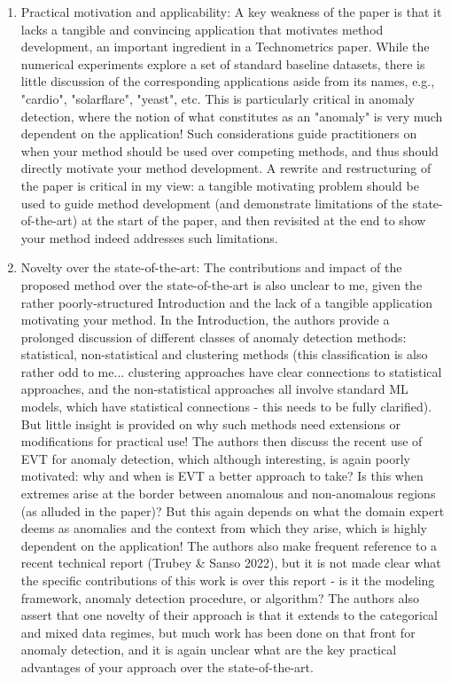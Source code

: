 \documentclass{article}
\begin{document}
\begin{enumerate}
\item Practical motivation and applicability: A key weakness of the paper is that it lacks a 
    tangible and convincing application that motivates method development, an important 
    ingredient in a Technometrics paper. While the numerical experiments explore a set of 
    standard baseline datasets, there is little discussion of the corresponding applications 
    aside from its names, e.g., "cardio", "solarflare", "yeast", etc. This is particularly 
    critical in anomaly detection, where the notion of what constitutes as an "anomaly" is 
    very much dependent on the application! Such considerations guide practitioners on when 
    your method should be used over competing methods, and thus should directly motivate your 
    method development. A rewrite and restructuring of the paper is critical in my view: a 
    tangible motivating problem should be used to guide method development (and demonstrate 
    limitations of the state-of-the-art) at the start of the paper, and then revisited at the 
    end to show your method indeed addresses such limitations. 

\item Novelty over the state-of-the-art: The contributions and impact of the proposed method 
    over the state-of-the-art is also unclear to me, given the rather poorly-structured 
    Introduction and the lack of a tangible application motivating your method. In the 
    Introduction, the authors provide a prolonged discussion of different classes of anomaly 
    detection methods: statistical, non-statistical and clustering methods (this classification 
    is also rather odd to me... clustering approaches have clear connections to statistical 
    approaches, and the non-statistical approaches all involve standard ML models, which have 
    statistical connections - this needs to be fully clarified). But little insight is provided 
    on why such methods need extensions or modifications for practical use! The authors then 
    discuss the recent use of EVT for anomaly detection, which although interesting, is again 
    poorly motivated: why and when is EVT a better approach to take? Is this when extremes 
    arise at the border between anomalous and non-anomalous regions (as alluded in the paper)? 
    But this again depends on what the domain expert deems as anomalies and the context from 
    which they arise, which is highly dependent on the application! The authors also make 
    frequent reference to a recent technical report (Trubey \& Sanso 2022), but it is not made 
    clear what the specific contributions of this work is over this report - is it the modeling 
    framework, anomaly detection procedure, or algorithm? The authors also assert that one 
    novelty of their approach is that it extends to the categorical and mixed data regimes, but 
    much work has been done on that front for anomaly detection, and it is again unclear what
    are the key practical advantages of your approach over the state-of-the-art.
\end{enumerate}
\end{document}

